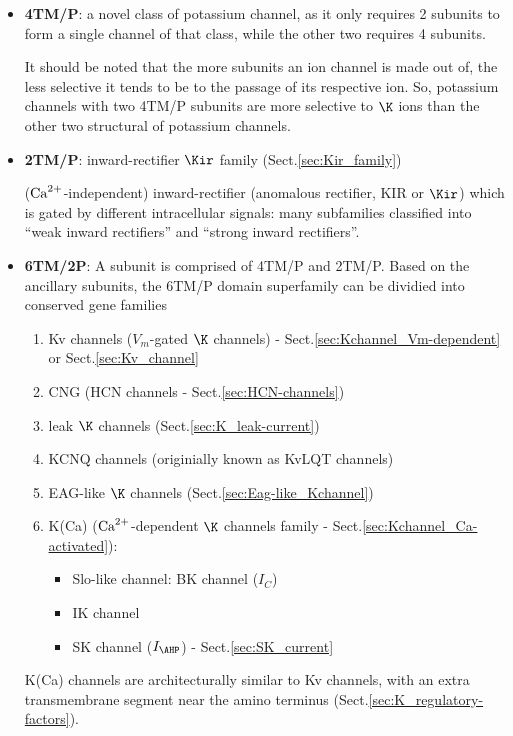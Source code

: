 \begin{itemize}
  
  \item {\bf 4TM/P}: a novel class of potassium channel, as it only requires 2
  subunits to form a single channel of that class, while the other two requires
  4 subunits.

It should be noted that the more subunits an ion channel is made out of, the
less selective it tends to be to the passage of its respective ion. So, 
potassium channels with two 4TM/P subunits are more selective to $\K$ ions than
the other two structural of potassium channels.

  \item {\bf 2TM/P}: inward-rectifier $\Kir$ family (Sect.\ref{sec:Kir_family}) 

  (${\text{Ca}^{2+}}$-independent) inward-rectifier (anomalous rectifier, KIR or
  $\Kir$) which is gated by different intracellular signals: many subfamilies
  classified into ``weak inward rectifiers'' and ``strong inward rectifiers''.
  
  \item {\bf 6TM/2P}: A subunit is comprised of 4TM/P and 2TM/P. Based on the
  ancillary subunits, the 6TM/P domain superfamily can be dividied into
  conserved gene families
  
\begin{enumerate}
  \item Kv channels ($V_m$-gated $\K$ channels) -
  Sect.\ref{sec:Kchannel_Vm-dependent} or Sect.\ref{sec:Kv_channel}
  
  
  \item CNG (HCN channels -  Sect.\ref{sec:HCN-channels}) 

  \item leak $\K$ channels (Sect.\ref{sec:K_leak-current}) 

  \item KCNQ channels (originially known as KvLQT channels)
  
  \item EAG-like $\K$ channels (Sect.\ref{sec:Eag-like_Kchannel})

  \item K(Ca) (${\text{Ca}^{2+}}$-dependent $\K$ channels family
  - Sect.\ref{sec:Kchannel_Ca-activated}):
	\begin{itemize}
	  \item Slo-like channel: BK channel ($I_C$)
	  \item IK channel
	  \item SK channel ($I_\AHP$) - Sect.\ref{sec:SK_current}
	\end{itemize}
\end{enumerate} 
K(Ca) channels are architecturally similar to Kv channels,
with an extra transmembrane segment near the amino terminus
(Sect.\ref{sec:K_regulatory-factors}).


\end{itemize}
